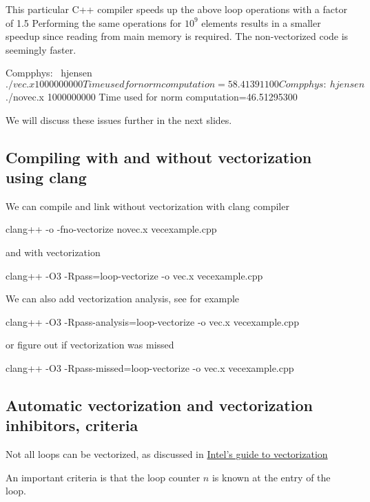 \documentclass[%
oneside,                 %
final,                   %
10pt]{article}
\begin{document}
\ecppcod

This particular C++ compiler speeds up the above loop operations with a factor of 1.5 
Performing the same operations for $10^9$ elements results in a smaller speedup since reading from main memory is required. The non-vectorized code is seemingly faster. 





\bcppcod
Compphys:~ hjensen$ ./vec.x 1000000000
Time used  for norm computation=58.41391100
Compphys:~ hjensen$ ./novec.x 1000000000
Time used  for norm computation=46.51295300

\ecppcod

We will discuss these issues further in the next slides.  

\subsection{Compiling with and without vectorization using clang}
We can compile and link without vectorization with clang compiler


\bcppcod
clang++ -o -fno-vectorize novec.x vecexample.cpp

\ecppcod

and with vectorization


\bcppcod
clang++ -O3 -Rpass=loop-vectorize -o  vec.x vecexample.cpp 

\ecppcod

We can also add vectorization analysis, see for example


\bcppcod
clang++ -O3 -Rpass-analysis=loop-vectorize -o  vec.x vecexample.cpp 

\ecppcod

or figure out if vectorization was missed


\bcppcod
clang++ -O3 -Rpass-missed=loop-vectorize -o  vec.x vecexample.cpp 

\ecppcod


\subsection{Automatic vectorization and vectorization inhibitors, criteria}

Not all loops can be vectorized, as discussed in \href{{https://software.intel.com/en-us/articles/a-guide-to-auto-vectorization-with-intel-c-compilers}}{Intel's guide to vectorization}

An important criteria is that the loop counter $n$ is known at the entry of the loop.
\end{document}
